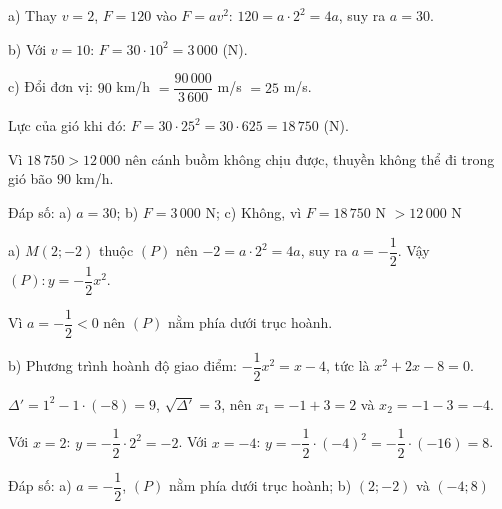 \begin{problem}[9DS-HSB2-010]
a) Thay $v = 2$, $F = 120$ vào $F = av^2$: $120 = a \cdot 2^2 = 4a$, suy ra $a = 30$.

b) Với $v = 10$: $F = 30 \cdot 10^2 = 3\,000$ (N).

c) Đổi đơn vị: $90$ km/h $= \dfrac{90\,000}{3\,600}$ m/s $= 25$ m/s.

Lực của gió khi đó: $F = 30 \cdot 25^2 = 30 \cdot 625 = 18\,750$ (N).

Vì $18\,750 > 12\,000$ nên cánh buồm không chịu được, thuyền không thể đi trong gió bão $90$ km/h.

Đáp số: a) $a = 30$; b) $F = 3\,000$ N; c) Không, vì $F = 18\,750$ N $> 12\,000$ N
\end{problem}

\begin{problem}[9DS-HSB2-006]
a) $M(2; -2)$ thuộc $(P)$ nên $-2 = a \cdot 2^2 = 4a$, suy ra $a = -\dfrac{1}{2}$. Vậy $(P)\colon y = -\dfrac{1}{2}x^2$.

Vì $a = -\dfrac{1}{2} < 0$ nên $(P)$ nằm phía dưới trục hoành.

b) Phương trình hoành độ giao điểm: $-\dfrac{1}{2}x^2 = x - 4$, tức là $x^2 + 2x - 8 = 0$.

$\Delta' = 1^2 - 1 \cdot (-8) = 9$, $\sqrt{\Delta'} = 3$, nên $x_1 = -1 + 3 = 2$ và $x_2 = -1 - 3 = -4$.

Với $x = 2$: $y = -\dfrac{1}{2} \cdot 2^2 = -2$. Với $x = -4$: $y = -\dfrac{1}{2} \cdot (-4)^2 = -\dfrac{1}{2} \cdot (-16) = 8$.

Đáp số: a) $a = -\dfrac{1}{2}$, $(P)$ nằm phía dưới trục hoành; b) $(2; -2)$ và $(-4; 8)$
\end{problem}
